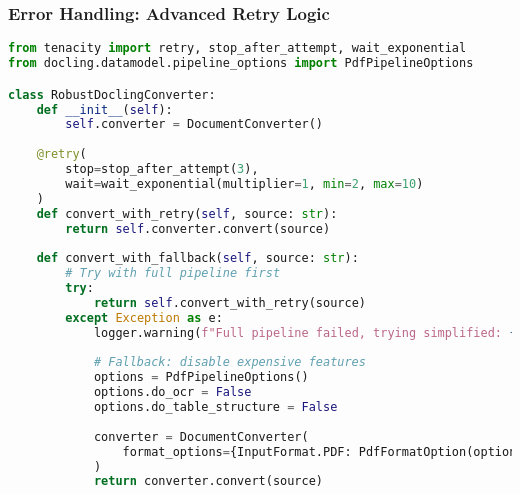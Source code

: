 \begin{frame}[fragile]\frametitle{Error Handling: Advanced Retry Logic}

\begin{lstlisting}[language=Python, basicstyle=\tiny]
from tenacity import retry, stop_after_attempt, wait_exponential
from docling.datamodel.pipeline_options import PdfPipelineOptions

class RobustDoclingConverter:
    def __init__(self):
        self.converter = DocumentConverter()
        
    @retry(
        stop=stop_after_attempt(3),
        wait=wait_exponential(multiplier=1, min=2, max=10)
    )
    def convert_with_retry(self, source: str):
        return self.converter.convert(source)
    
    def convert_with_fallback(self, source: str):
        # Try with full pipeline first
        try:
            return self.convert_with_retry(source)
        except Exception as e:
            logger.warning(f"Full pipeline failed, trying simplified: {e}")
            
            # Fallback: disable expensive features
            options = PdfPipelineOptions()
            options.do_ocr = False
            options.do_table_structure = False
            
            converter = DocumentConverter(
                format_options={InputFormat.PDF: PdfFormatOption(options)}
            )
            return converter.convert(source)
\end{lstlisting}
\end{frame}


